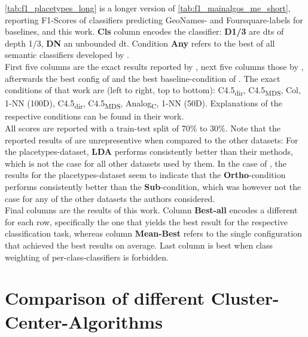 \autoref{tab:f1_placetypes_long} is a longer version of \autoref{tab:f1_mainalgos_me_short}, reporting F1-Scores of classifiers predicting GeoNames- and Foursquare-labels for baselines, \mainalgos and this work. 
\textbf{Cls} column encodes the classifier: \textbf{D1/3} are \glspl{dt} of depth 1/3, \textbf{DN} an unbounded \gls{dt}. Condition \textbf{Any} refers to the best of all semantic classifiers developed by \cite{Derrac2015}. \\
First five columns are the exact results reported by \cite{Alshaikh2020}, next five columns those by \cite{Ager2018}, afterwards the best config of \cite{Derrac2015} and the best baseline-condition of \cite{Derrac2015}. The exact conditions of that work are (left to right, top to bottom): C4.5\textsubscript{dir}, C4.5\textsubscript{MDS}, Col, 1-NN (100D), C4.5\textsubscript{dir}, C4.5\textsubscript{MDS}, Analog\textsubscript{C}, 1-NN (50D). Explanations of the respective conditions can be found in their work. \\
All scores are reported with a train-test split of 70\% to 30\%. Note that the reported results of \cite{Ager2018} are unrepresentive when compared to the other datasets: For the placetypes-dataset, \textbf{LDA} performs consistently better than their methods, which is not the case for all other datasets used by them. In the case of \cite{Alshaikh2020}, the results for the placetypes-dataset seem to indicate that the \textbf{Ortho}-condition performs consistently better than the \textbf{Sub}-condition, which was however not the case for any of the other datasets the authors considered. \\
Final columns are the results of this work. Column \textbf{Best-all} encodes a different for each row, specifically the one that yields the best result for the respective classification task, whereas column \textbf{Mean-Best} refers to the single configuration that achieved the best results on average. Last column is best when class weighting of per-class-classifiers is forbidden.

\section{Comparison of different Cluster-Center-Algorithms}


